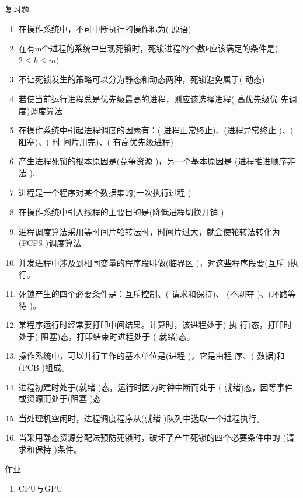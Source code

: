 \begin{frame}{复习题}
  \begin{enumerate}
  \item 在操作系统中，不可中断执行的操作称为( {\color{white}原语})
  \item 在有m个进程的系统中出现死锁时，死锁进程的个数k应该满足的条件是(
    {\color{white}$2 \leq k \leq m$})
  \item 不让死锁发生的策略可以分为静态和动态两种，死锁避免属于( {\color{white}
      动态})
  \item 若使当前运行进程总是优先级最高的进程，则应该选择进程( {\color{white}高优先级优
      先调度})调度算法
  \item 在操作系统中引起进程调度的因素有：( {\color{white}进程正常终止})、({\color{white}进程异常终止 })、({\color{white} 阻塞})、({\color{white} 时
      间片用完})、({\color{white} 有高优先级进程})
  \item 产生进程死锁的根本原因是({\color{white}竞争资源 })，另一个基本原因是
    ({\color{white}进程推进顺序非法 }).
  \item 进程是一个程序对某个数据集的({\color{white}一次执行过程 })
  \item 在操作系统中引入线程的主要目的是({\color{white}降低进程切换开销 })
  \item 进程调度算法采用等时间片轮转法时，时间片过大，就会使轮转法转化为({\color{white}FCFS })调度算法
  \item 并发进程中涉及到相同变量的程序段叫做({\color{white}临界区 })，对这些程序段要({\color{white}互斥 })执行。
  \item 死锁产生的四个必要条件是：互斥控制、({\color{white} }请求和保持)、
    ({\color{white}不剥夺 })、({\color{white}环路等待 })。
  \item 某程序运行时经常要打印中间结果。计算时，该进程处于({\color{white} 执
      行})态，打印时处于({\color{white} 阻塞})态，打印结束时进程处于
    ({\color{white} 就绪})态。
  \item 操作系统中，可以并行工作的基本单位是({\color{white}进程 })，它是由程
    序、({\color{white} 数据})和({\color{white}PCB })组成。
  \item 进程初建时处于({\color{white}就绪 })态，运行时因为时钟中断而处于
    ({\color{white} 就绪})态，因等事件或资源而处于({\color{white}阻塞 })态
  \item 当处理机空闲时，进程调度程序从({\color{white}就绪 })队列中选取一个进程执行。
  \item 当采用静态资源分配法预防死锁时，破坏了产生死锁的四个必要条件中的
    ({\color{white}请求和保持 })条件。
  \end{enumerate}
\end{frame}

\begin{frame}[fragile]{作业}
  \begin{enumerate}
  \item CPU与GPU
  \end{enumerate}
\end{frame}

